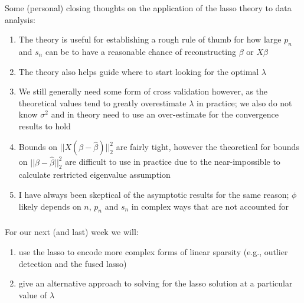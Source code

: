 \begin{frame}[fragile] \frametitle{}

Some (personal) closing thoughts on the application of the lasso theory
to data analysis:
\begin{enumerate}
\item The theory is useful for establishing a rough rule of thumb
for how large $p_n$ and $s_n$ can be to have a reasonable chance
of reconstructing $\beta$ or $X\beta$ \pause
\item The theory also helps guide where to start looking for the
optimal $\lambda$ \pause
\item We still generally need some form of cross validation however,
as the theoretical values tend to greatly overestimate $\lambda$ in
practice; we also do not know $\sigma^2$ and in theory need to use
an over-estimate for the convergence results to hold \pause
\item Bounds on $|| X (\beta - \widehat{\beta}) ||_2^2$ are fairly
tight, however the theoretical for bounds on $|| \beta - \widehat{\beta} ||_2^2$
are difficult to use in practice due to the near-impossible to calculate
restricted eigenvalue assumption \pause
\item I have always been skeptical of the asymptotic results for the same
reason; $\phi$ likely depends on $n$, $p_n$ and $s_n$ in complex ways that
are not accounted for
\end{enumerate}

\end{frame}

\begin{frame}[fragile] \frametitle{}

For our next (and last) week we will:
\begin{enumerate}
\item use the lasso to encode more complex forms of linear sparsity (e.g., outlier
detection and the fused lasso)
\item give an alternative approach to solving for the lasso solution at
a particular value of $\lambda$
\end{enumerate}

\end{frame}













